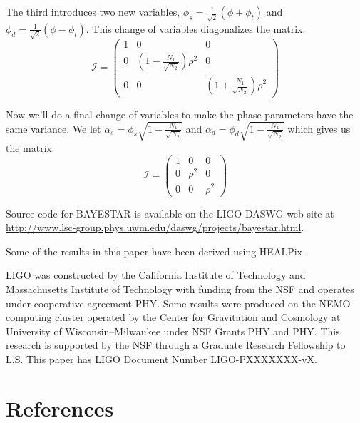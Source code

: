 \documentclass{iopart}
\begin{document}
The third introduces two new variables, $\phi_s = \frac{1}{\sqrt{2}}(\phi + \phi_t)$ and $\phi_d = \frac{1}{\sqrt{2}}(\phi - \phi_t)$. This change of variables diagonalizes the matrix.
\[
\mathcal{I} =
\left( {\begin{array}{ccc}
 1 & 0 & 0 \\
 0 & (1 - \frac{N_1}{\sqrt{N_2}})\rho^2 & 0 \\
 0 & 0 & (1 + \frac{N_1}{\sqrt{N_2}})\rho^2
 \end{array} } \right)
\]

Now we'll do a final change of variables to make the phase parameters have the same variance. We let $\alpha_s = \phi_s \sqrt{1 - \frac{N_1}{\sqrt{N_2}}}$ and $\alpha_d = \phi_d \sqrt{1 - \frac{N_1}{\sqrt{N_2}}}$ which gives us the matrix
\[
\mathcal{I} =
\left( {\begin{array}{ccc}
 1 & 0 & 0 \\
 0 & \rho^2 & 0 \\
 0 & 0 & \rho^2
 \end{array} } \right)
\]



\ack Source code for \ac{BAYESTAR} is available on the \acs{LIGO} \acl{DASWG} web site at \url{http://www.lsc-group.phys.uwm.edu/daswg/projects/bayestar.html}.

Some of the results in this paper have been derived using HEALPix \cite{healpix}.

\acs{LIGO} was constructed by the California Institute of Technology and Massachusetts Institute of Technology with funding from the \ac{NSF} and operates under cooperative agreement PHY. Some results were produced on the NEMO computing cluster operated by the Center for Gravitation and Cosmology at University of Wisconsin\nobreakdashes--Milwaukee under \ac{NSF} Grants PHY and PHY. This research is supported by the \ac{NSF} through a Graduate Research Fellowship to L.S. This paper has \acs{LIGO} Document Number \acs{LIGO}\nobreakdashes-PXXXXXXX\nobreakdashes-vX.


\section*{References}


\end{document}
